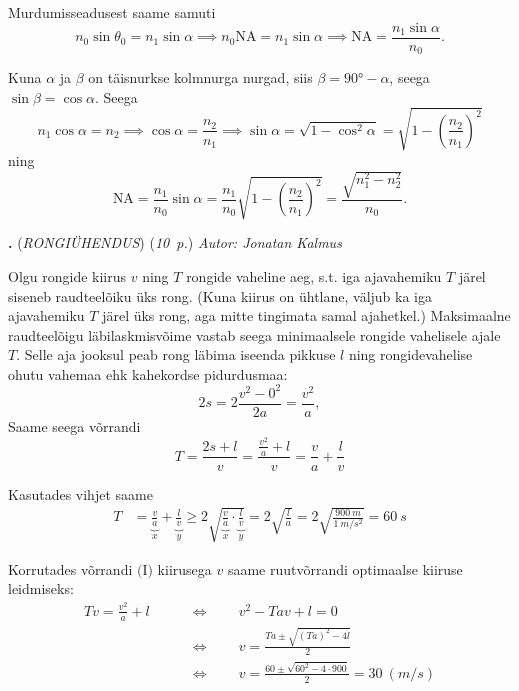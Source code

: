 \documentclass[11pt,a5paper]{article}
\newcommand{\numb}[1]{\vspace{5pt}\textbf{\large #1}}
\newcommand{\nimi}[1]{(\textsl{\small #1})}
\newcommand{\punktid}[1]{(\emph{#1~p.})}
\newcounter{ylesanne}
\newcommand{\yl}[1]{\addtocounter{ylesanne}{1}\numb{\theylesanne.} \nimi{#1} \newblock{}}
\newcommand{\autor}[1]{\emph{ Autor: #1}}%
\begin{document}
Murdumisseadusest saame samuti
\begin{equation*}
    n_0 \sin \theta_0 = n_1 \sin \alpha \implies n_0 \text{NA} = n_1 \sin \alpha \implies \text{NA} = \frac{n_1 \sin \alpha}{n_0}.
\end{equation*}

Kuna $\alpha$ ja $\beta$ on täisnurkse kolmnurga nurgad, siis $\beta = \ang{90} - \alpha$, seega $\sin \beta = \cos \alpha$. Seega
\begin{equation*}
    n_1 \cos\alpha = n_2 \implies \cos \alpha = \frac{n_2}{n_1} \implies \sin\alpha = \sqrt{1-\cos^2\alpha} = \sqrt{1-\left(\frac{n_2}{n_1}\right)^2}
\end{equation*}
ning
\begin{equation*}
    \text{NA} = \frac{n_1}{n_0}\sin\alpha = \frac{n_1}{n_0}\sqrt{1-\left(\frac{n_2}{n_1}\right)^2} = \frac{\sqrt{n_1^2-n_2^2}}{n_0}.
\end{equation*}



\yl{RONGIÜHENDUS}
\punktid{10} \autor{Jonatan Kalmus}

Olgu rongide kiirus $v$ ning $T$ rongide vaheline aeg, s.t. iga ajavahemiku $T$ järel siseneb raudteelõiku üks rong. (Kuna kiirus on ühtlane, väljub ka iga ajavahemiku $T$ järel üks rong, aga mitte tingimata samal ajahetkel.) Maksimaalne raudteelõigu läbilaskmisvõime vastab seega minimaalsele rongide vahelisele ajale $T$. Selle aja jooksul peab rong läbima iseenda pikkuse $l$ ning rongidevahelise ohutu vahemaa ehk kahekordse pidurdusmaa:
\begin{equation*}
    2s = 2\frac{v^2-0^2}{2a}=\frac{v^2}{a},
\end{equation*}
Saame seega võrrandi 
\begin{equation*}
    T = \frac{2s+l}{v} = \frac{\frac{v^2}{a}+l}{v} = \frac{v}{a} + \frac{l}{v} \tag{I}
\end{equation*}

Kasutades vihjet saame
\begin{align*}
    T &= \underbrace{\frac{v}{a}}_{x} + \underbrace{\frac{l}{v}}_{y} \geq 2 \sqrt{\underbrace{\frac{v}{a}}_{x} \cdot \underbrace{\frac{l}{v}}_{y}} 
    = 2\sqrt{\frac{l}{a}} = 2 \sqrt{\frac{\SI{900}{m}}{\SI{1}{m/s^2}}} = \SI{60}{s} \tag{II}
\end{align*}

Korrutades võrrandi $\text{(I)}$ kiirusega $v$ saame ruutvõrrandi optimaalse kiiruse leidmiseks:
\begin{align*}
    Tv = \frac{v^2}{a}+l \qquad &\Longleftrightarrow \qquad v^2 - Tav + l = 0 \\
                                &\Longleftrightarrow \qquad v = \frac{Ta \pm \sqrt{(Ta)^2 - 4l}}{2} \\
                                &\Longleftrightarrow \qquad v = \frac{60 \pm \sqrt{60^2 - 4\cdot 900}}{2} = \SI{30}{(m/s)}
\end{align*}
\end{document}
